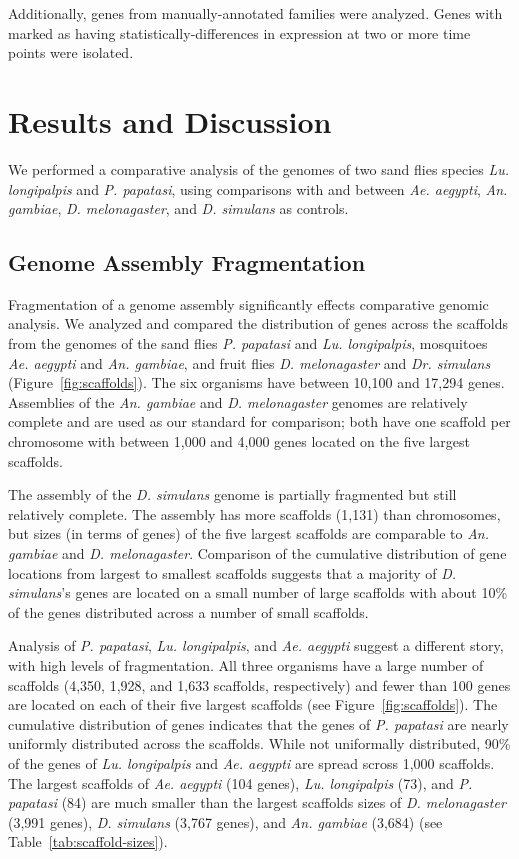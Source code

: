 Additionally, genes from manually-annotated families were analyzed.  Genes with marked as having statistically-differences in expression at two or more time points were isolated.

\section{Results and Discussion}
We performed a comparative analysis of the genomes of two sand flies species \emph{Lu. longipalpis} and \emph{P. papatasi}, using comparisons with and between \emph{Ae. aegypti}, \emph{An. gambiae}, \emph{D. melonagaster}, and \emph{D. simulans} as controls.

\subsection{Genome Assembly Fragmentation}
Fragmentation of a genome assembly significantly effects comparative genomic analysis.  We analyzed and compared the distribution of genes across the scaffolds from the genomes of the sand flies \emph{P. papatasi} and \emph{Lu. longipalpis}, mosquitoes \emph{Ae. aegypti} and \emph{An. gambiae}, and fruit flies \emph{D. melonagaster} and \emph{Dr. simulans} (Figure~\ref{fig:scaffolds}).  The six organisms have between 10,100 and 17,294 genes.  Assemblies of the \emph{An. gambiae} and \emph{D. melonagaster} genomes are relatively complete and are used as our standard for comparison; both have one scaffold per chromosome with between 1,000 and 4,000 genes located on the five largest scaffolds.

The assembly of the \emph{D. simulans} genome is partially fragmented but still relatively complete.  The assembly has more scaffolds (1,131) than chromosomes, but sizes (in terms of genes) of the five largest scaffolds are comparable to \emph{An. gambiae} and \emph{D. melonagaster}.  Comparison of the cumulative distribution of gene locations from largest to smallest scaffolds suggests that a majority of \emph{D. simulans}'s genes are located on a small number of large scaffolds with about 10\% of the genes distributed across a number of small scaffolds.

Analysis of \emph{P. papatasi}, \emph{Lu. longipalpis}, and \emph{Ae. aegypti} suggest a different story, with high levels of fragmentation.  All three organisms have a large number of scaffolds (4,350, 1,928, and 1,633 scaffolds, respectively) and fewer than 100 genes are located on each of their five largest scaffolds (see Figure~\ref{fig:scaffolds}).  The cumulative distribution of genes indicates that the genes of \emph{P. papatasi} are nearly uniformly distributed across the scaffolds.  While not uniformally distributed, 90\% of the genes of \emph{Lu. longipalpis} and \emph{Ae. aegypti} are spread scross 1,000 scaffolds. The largest scaffolds of \emph{Ae. aegypti} (104 genes), \emph{Lu. longipalpis} (73), and \emph{P. papatasi} (84) are much smaller than the largest scaffolds sizes of \emph{D. melonagaster} (3,991 genes), \emph{D. simulans} (3,767 genes), and \emph{An. gambiae} (3,684) (see Table~\ref{tab:scaffold-sizes}).

